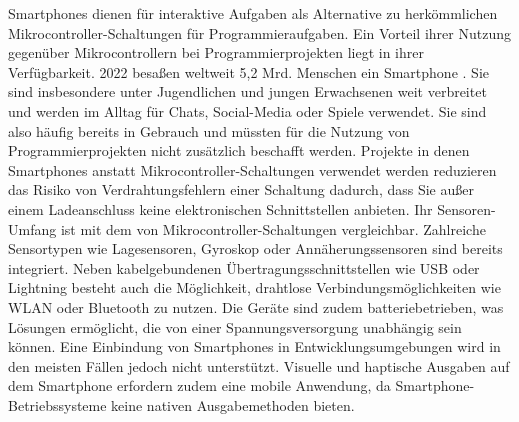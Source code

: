 \documentclass[11pt,a4paper]{report}
\begin{document}
Smartphones dienen für interaktive Aufgaben als Alternative zu herkömmlichen Mikrocontroller-Schaltungen für Programmieraufgaben.
Ein Vorteil ihrer Nutzung gegenüber Mikrocontrollern bei Programmierprojekten liegt in ihrer Verfügbarkeit.
2022 besaßen weltweit 5,2 Mrd. Menschen ein Smartphone \cite{smartphone_users}.
Sie sind insbesondere unter Jugendlichen und jungen Erwachsenen weit verbreitet und werden im Alltag für Chats, Social-Media oder Spiele verwendet.
Sie sind also häufig bereits in Gebrauch und müssten für die Nutzung von Programmierprojekten nicht zusätzlich beschafft werden.
Projekte in denen Smartphones anstatt Mikrocontroller-Schaltungen verwendet werden reduzieren das Risiko von Verdrahtungsfehlern einer Schaltung dadurch, dass Sie außer einem Ladeanschluss keine elektronischen Schnittstellen anbieten.
Ihr Sensoren-Umfang ist mit dem von Mikrocontroller-Schaltungen vergleichbar.
Zahlreiche Sensortypen wie Lagesensoren, Gyroskop oder Annäherungssensoren sind bereits integriert.
Neben kabelgebundenen Übertragungsschnittstellen wie USB oder Lightning besteht auch die Möglichkeit, drahtlose Verbindungsmöglichkeiten wie WLAN oder Bluetooth zu nutzen.
Die Geräte sind zudem batteriebetrieben, was Lösungen ermöglicht, die von einer Spannungsversorgung unabhängig sein können. 
Eine Einbindung von Smartphones in Entwicklungsumgebungen wird in den meisten Fällen jedoch nicht unterstützt.
Visuelle und haptische Ausgaben auf dem Smartphone erfordern zudem eine mobile Anwendung, da Smartphone-Betriebssysteme keine nativen Ausgabemethoden bieten.
\end{document}
